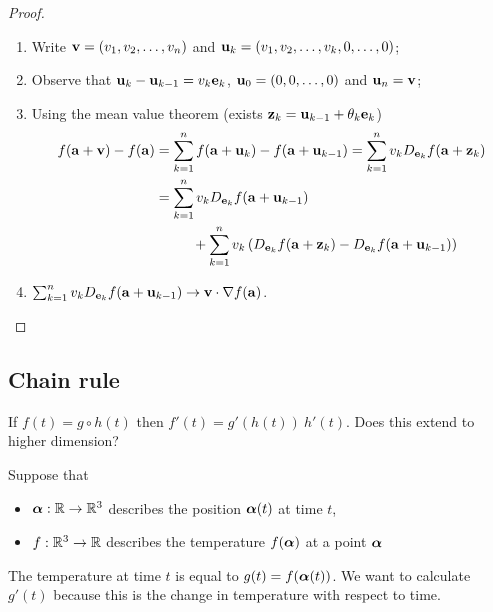\begin{proof}
    \begin{enumerate}
        \item Write \(\mathbf{v} = (v_1,v_2,\ldots,v_n)\)
              and
              \(\mathbf{u}_k = (v_1,v_2,\ldots,v_k,0,\ldots,0)\);
        \item Observe that \(\mathbf{u}_k - \mathbf{u}_{k-1} = v_k \mathbf{e}_k\), \(\mathbf{u}_0 = (0,0,\ldots,0)\) and \(\mathbf{u}_n = \mathbf{v}\);
        \item Using the mean value theorem (exists \( \mathbf{z}_k = \mathbf{u}_{k-1}+ \theta_k \mathbf{e}_k\)) \vspace{-0.9em}
              \[
                  \begin{aligned}
                      f(\mathbf{a}+\mathbf{v}) - f(\mathbf{a})
                       & = \sum_{k=1}^{n} f(\mathbf{a} + \mathbf{u}_k) - f(\mathbf{a} + \mathbf{u}_{k-1})
                      = \sum_{k=1}^{n} v_k  D_{\mathbf{e}_k}f(\mathbf{a} +  \mathbf{z}_k)                                                                  \\
                       & = \sum_{k=1}^{n} v_k  D_{\mathbf{e}_k}f(\mathbf{a} + \mathbf{u}_{k-1})                                                            \\
                       & \ \ \ \ \ \ \ \ + \sum_{k=1}^{n}  v_k \left(  D_{\mathbf{e}_k}f(\mathbf{a} +  \mathbf{z}_k)-  D_{\mathbf{e}_k}f(\mathbf{a} + \mathbf{u}_{k-1}) \right)
                  \end{aligned}
              \]
        \item \(\sum_{k=1}^{n} v_k  D_{\mathbf{e}_k}f(\mathbf{a} + \mathbf{u}_{k-1}) \to \mathbf{v} \cdot \nabla f(\mathbf{a})\). \qedhere
    \end{enumerate}
\end{proof}


\subsection*{Chain rule}

If \(f(t) = g\circ h(t)\) then \(f'(t) = g'(h(t)) \ h'(t)\).
Does this extend to higher dimension?

\begin{example*}
    Suppose that
    \begin{itemize}
        \item \(\boldsymbol{\alpha}:\mathbb{R} \to \mathbb{R}^3\) describes the position \(\boldsymbol{\alpha}(t)\) at time \(t\),
        \item \(f:\mathbb{R}^3 \to \mathbb{R}\) describes the temperature \(f(\boldsymbol{\alpha})\) at a point \(\boldsymbol{\alpha}\)
    \end{itemize}
    The temperature at time \(t\) is equal to \(g(t)=f(\boldsymbol{\alpha}(t))\).
    We want to calculate \(g'(t)\) because this is the change in temperature with respect to time.
\end{example*}


